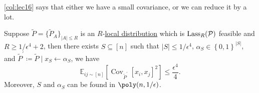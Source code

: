 \begin{remark}
	\autoref{col:lec16} says that either we have a small covariance, or we can reduce it by a lot.
\end{remark}

\begin{theorem}\label{thm:lec16}
	Suppose \(\widetilde{P} =\{ \widetilde{P} _A \}_{\left\vert A \right\vert \leq R} \) is an \(R\)-\hyperref[def:local-distribution]{local distribution} which is \(\mathop{\mathrm{Lass}}_R(\mathcal{\MakeUppercase{p}})\) feasible and \(R \geq 1 / \epsilon ^4 + 2\), then there exists \(S \subseteq [n]\) such that \(\left\vert S \right\vert \leq 1 / \epsilon ^4\), \(\alpha _S \in \left\{ 0, 1 \right\} ^{\left\vert S \right\vert }\), and \(\widetilde{P} ^\prime \coloneqq \widetilde{P} \mid x_S\gets \alpha _S\), we have
	\[
		\mathbb{E}_{ij\sim [n]}\left[\mathop{\mathrm{Cov}}\nolimits_{\widetilde{P} ^\prime }\left[x_i, x_j \right]^{2} \right] \leq \frac{\epsilon ^4}{4}.
	\]
	Moreover, \(S\) and \(\alpha _S\) can be found in \(\poly(n, 1 / \epsilon )\).
\end{theorem}
